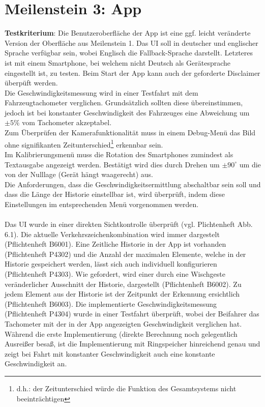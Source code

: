 \documentclass[12pt,a4paper,ngerman,enabledeprecatedfontcommands]{scrreprt}
\begin{document}
\section{Meilenstein 3: App}
\textbf{Testkriterium}: Die Benutzeroberfläche der App ist eine ggf. leicht veränderte Version der Oberfläche aus Meilenstein 1. Das \gls{UI} soll in deutscher und englischer Sprache verfügbar sein, wobei Englisch die Fallback-Sprache darstellt. Letzteres ist mit einem \gls{Smartphone}, bei welchem nicht Deutsch als Gerätesprache eingestellt ist, zu testen. Beim Start der \gls{App} kann auch der geforderte Disclaimer überpüft werden.\\
Die Geschwindigkeitsmessung wird in einer Testfahrt mit dem Fahrzeugtachometer verglichen. Grundsätzlich sollten diese übereinstimmen, jedoch ist bei konstanter Geschwindigkeit des Fahrzeuges eine Abweichung um $\pm 5\%$ vom Tachometer akzeptabel.\\
Zum Überprüfen der Kamerafunktionalität muss in einem Debug-Menü das Bild ohne signifikanten Zeitunterschied\footnote{d.h.: der Zeitunterschied würde die Funktion des Gesamtsystems nicht beeinträchtigen} erkennbar sein.\\
Im Kalibrierungsmenü muss die Rotation des \gls{Smartphone}s zumindest als Textausgabe angezeigt werden. Bestätigt wird dies durch Drehen um $\pm90^\circ$ um die  von der Nulllage (Gerät hängt waagerecht) aus.\\
Die Anforderungen, dass die Geschwindigkeitsermittlung abschaltbar sein soll und dass die Länge der Historie einstellbar ist, wird überprüft, indem diese Einstellungen im entsprechenden Menü vorgenommen werden. \\
\\
Das \gls{UI} wurde in einer direkten Sichtkontrolle überprüft (vgl. Plichtenheft Abb. 6.1).
Die aktuelle Verkehrszeichenkombination wird immer dargestelt (Pflichtenheft B6001).
Eine Zeitliche Historie in der App ist vorhanden (Pflichtenheft P4302) und die Anzahl der maximalen Elemente, welche in der Historie gespeichert werden, lässt sich auch individuell konfigurieren (Pflichtenheft P4303).
Wie gefordert, wird einer durch eine Wischgeste veränderlicher Ausschnitt der Historie, dargestellt (Pflichtenheft B6002). Zu jedem Element aus der Historie ist der Zeitpunkt der Erkennung ersichtlich (Pflichtenheft B6003). Die implementierte Geschwindigkeitsmessung (Pflichtenheft P4304) wurde in einer Testfahrt überprüft, wobei der Beifahrer das Tachometer mit der in der \gls{App} angezeigten Geschwindigkeit verglichen hat. Während die erste Implementierung (direkte Berechnung noch gelegentlich Ausreißer besaß, ist die Implementierung mit Ringspeicher hinreichend genau und zeigt bei Fahrt mit konstanter Geschwindigkeit auch eine konstante Geschwindigkeit an.\\
\end{document}
